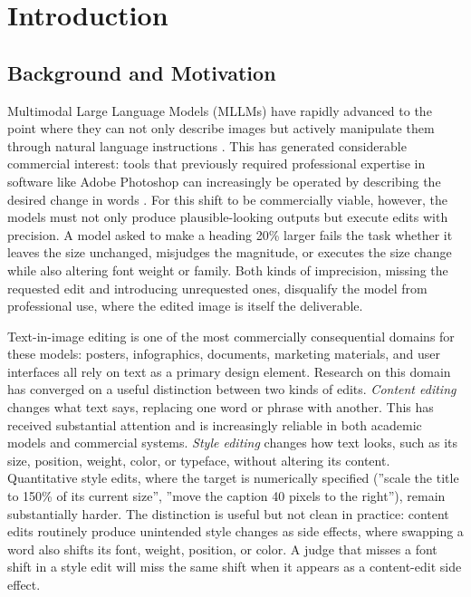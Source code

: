 \chapter{Introduction} \label{Introduction}

\section{Background and Motivation}

\label{Background and Motivation}

Multimodal Large Language Models (MLLMs) have rapidly advanced to the point where they can not only describe images but actively manipulate them through natural language instructions \cite{liu2023visualinstructiontuning, openai2024gpt4technicalreport}. This has generated considerable commercial interest: tools that previously required professional expertise in software like Adobe Photoshop can increasingly be operated by describing the desired change in words \cite{adobe2023firefly}. For this shift to be commercially viable, however, the models must not only produce plausible-looking outputs but execute edits with precision. A model asked to make a heading 20\% larger fails the task whether it leaves the size unchanged, misjudges the magnitude, or executes the size change while also altering font weight or family. Both kinds of imprecision, missing the requested edit and introducing unrequested ones, disqualify the model from professional use, where the edited image is itself the deliverable.

Text-in-image editing is one of the most commercially consequential domains for these models: posters, infographics, documents, marketing materials, and user interfaces all rely on text as a primary design element. Research on this domain has converged on a useful distinction between two kinds of edits. \textit{Content editing} changes what text says, replacing one word or phrase with another. This has received substantial attention and is increasingly reliable in both academic models \cite{tuo2024anytext, zeng2024textctrl} and commercial systems. \textit{Style editing} changes how text looks, such as its size, position, weight, color, or typeface, without altering its content. Quantitative style edits, where the target is numerically specified (''scale the title to 150\% of its current size'', ''move the caption 40 pixels to the right''), remain substantially harder.  The distinction is useful but not clean in practice: content edits routinely produce unintended style changes as side effects, where swapping a word also shifts its font, weight, position, or color. 
A judge that misses a font shift in a style edit will miss the same shift when it appears as a content-edit side effect.

